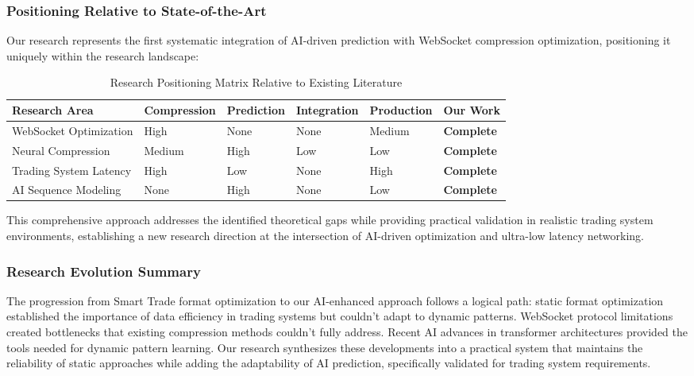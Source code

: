 \documentclass[12pt,a4paper]{article}
\begin{document}
\subsubsection{Positioning Relative to State-of-the-Art}

Our research represents the first systematic integration of AI-driven prediction with WebSocket compression optimization, positioning it uniquely within the research landscape:

\begin{table}[H]
\centering
\begin{tabular}{|l|l|l|l|l|l|}
\hline
\textbf{Research Area} & \textbf{Compression} & \textbf{Prediction} & \textbf{Integration} & \textbf{Production} & \textbf{Our Work} \\
\hline
WebSocket Optimization & High & None & None & Medium & \textbf{Complete} \\
Neural Compression & Medium & High & Low & Low & \textbf{Complete} \\
Trading System Latency & High & Low & None & High & \textbf{Complete} \\
AI Sequence Modeling & None & High & None & Low & \textbf{Complete} \\
\hline
\end{tabular}
\caption{Research Positioning Matrix Relative to Existing Literature}
\label{tab:research-positioning}
\end{table}

This comprehensive approach addresses the identified theoretical gaps while providing practical validation in realistic trading system environments, establishing a new research direction at the intersection of AI-driven optimization and ultra-low latency networking.

\subsubsection{Research Evolution Summary}

The progression from Smart Trade format optimization to our AI-enhanced approach follows a logical path: static format optimization established the importance of data efficiency in trading systems but couldn't adapt to dynamic patterns. WebSocket protocol limitations created bottlenecks that existing compression methods couldn't fully address. Recent AI advances in transformer architectures provided the tools needed for dynamic pattern learning. Our research synthesizes these developments into a practical system that maintains the reliability of static approaches while adding the adaptability of AI prediction, specifically validated for trading system requirements.
\end{document}
